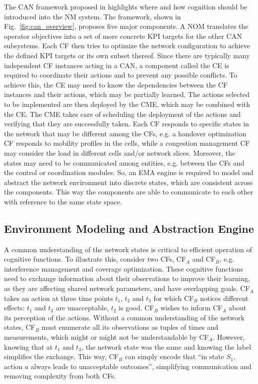 			The \ac{CAN} framework proposed in \cite{can_itu} highlights where and how cognition should be introduced into the \ac{NM} system.
			The framework, shown in Fig.~\ref{fig:can_overview}, proposes five major components.
			A \ac{NOM} translates the operator objectives into a set of more concrete \ac{KPI} targets for the other CAN subsystems. 
			Each \ac{CF} then tries to optimize the network configuration to achieve the defined \ac{KPI} targets or its own subset thereof. 
			Since there are typically many independent \ac{CF} instances acting in a \ac{CAN}, a component called the \ac{CE} is required to coordinate their actions and to prevent any possible conflicts. 
			To achieve this, the \ac{CE} may need to know the dependencies between the \ac{CF} instances and their actions, which may be partially learned.
			The actions selected to be implemented are then deployed by the \ac{CME}, which may be combined with the \ac{CE}.
			The \ac{CME} takes care of scheduling the deployment of the actions and verifying that they are successfully taken.
			Each \ac{CF} responds to specific states in the network that may be different among the \acp{CF}, e.g. a handover optimization CF responds to mobility profiles in the cells, while a congestion management \ac{CF} may consider the load in different cells and/or network slices. 
			Moreover, the states may need to be communicated among entities, e.g. between the \acp{CF} and the control or coordination modules.
			So, an \ac{EMA} engine is required to model and abstract the network environment into discrete states, which are consistent across the components.
			This way the components are able to communicate to each other with reference to the same state space.
			
		 \subsection{Environment Modeling and Abstraction Engine}
		 
	 		A common understanding of the network states is critical to efficient operation of cognitive functions.
	 		To illustrate this, consider two \acp{CF}, CF$_A$ and CF$_B$, e.g. interference management and coverage optimization. 
		 	These cognitive functions need to exchange information about their observations to improve their learning, as they are affecting shared network parameters, and have overlapping goals.
		 	CF$_A$ takes an action at three time points $t_1$, $t_2$ and $t_3$ for which CF$_B$ notices different effects: $t_1$ and $t_3$ are unacceptable, $t_2$ is good.
		 	CF$_B$ wishes to inform CF$_A$ about its perception of the actions. 
		 	Without a common understanding of the network states, CF$_B$ must enumerate all its observations as tuples of times and measurements, which might or might not be understandable by CF$_A$.
		 	However, knowing that at $t_1$ and $t_3$, the network state was the same and knowing the label simplifies the exchange.
		 	This way, CF$_B$ can simply encode that “in state $S_1$, action $a$ always leads to unacceptable outcomes”, simplifying communication and removing complexity from both \acp{CF}.
		 	

